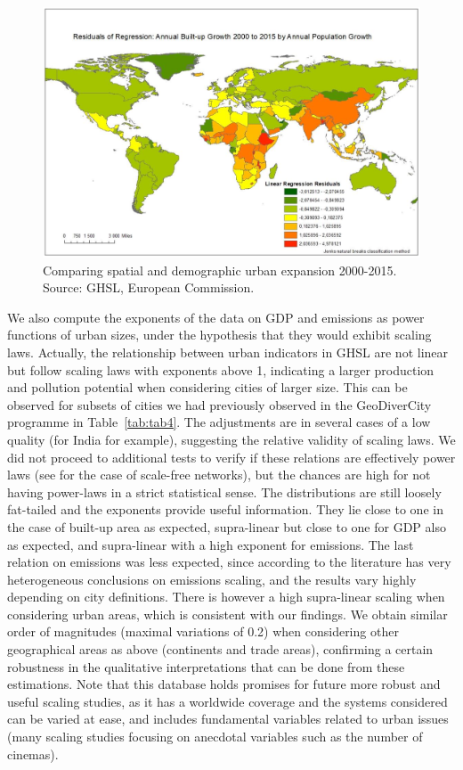 \documentclass[11pt]{article}
\begin{document}
\begin{figure}
\centering
\includegraphics[width=\textwidth]{Fig4.png}
\caption{Comparing spatial and demographic urban expansion 2000-2015. Source: GHSL, European Commission.\label{fig:fig4}}
\end{figure}   



We also compute the exponents of the data on GDP and emissions as power functions of urban sizes, under the hypothesis that they would exhibit scaling laws. Actually, the relationship between urban indicators in GHSL are not linear but follow scaling laws with exponents above 1, indicating a larger production and pollution potential when considering cities of larger size. This can be observed for subsets of cities we had previously observed in the GeoDiverCity programme in Table~\ref{tab:tab4}. The adjustments are in several cases of a low quality (for India for example), suggesting the relative validity of scaling laws. We did not proceed to additional tests to verify if these relations are effectively power laws (see \cite{broido2019scale} for the case of scale-free networks), but the chances are high for not having power-laws in a strict statistical sense. The distributions are still loosely fat-tailed and the exponents provide useful information. They lie close to one in the case of built-up area as expected, supra-linear but close to one for GDP also as expected, and supra-linear with a high exponent for emissions. The last relation on emissions was less expected, since according to \cite{ribeiro2019effects} the literature has very heterogeneous conclusions on emissions scaling, and the results vary highly depending on city definitions. There is however a high supra-linear scaling when considering urban areas, which is consistent with our findings. We obtain similar order of magnitudes (maximal variations of 0.2) when considering other geographical areas as above (continents and trade areas), confirming a certain robustness in the qualitative interpretations that can be done from these estimations. Note that this database holds promises for future more robust and useful scaling studies, as it has a worldwide coverage and the systems considered can be varied at ease, and includes fundamental variables related to urban issues (many scaling studies focusing on anecdotal variables such as the number of cinemas).
\end{document}
